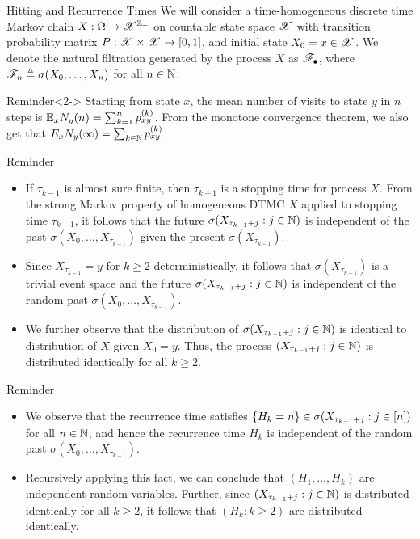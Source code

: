 \documentclass[12pt,aspectratio=169]{beamer}
\begin{document}
\begin{frame}{Hitting and Recurrence Times}
We will consider a time-homogeneous discrete time Markov chain $X: \Omega \to \mathscr{X}^{\mathbb{Z}_+}$ on countable state space $\mathscr{X}$ with transition probability matrix $P: \mathscr{X} \times \mathscr{X} \to [0,1]$, 
and initial state $X_0 = x \in \mathscr{X}$. 
We denote the natural filtration generated by the process $X$ as $\mathscr{F}_\bullet$, 
where $\mathscr{F}_n \triangleq \sigma(X_0, \dots, X_n)$ for all $n \in \mathbb{N}$. 
\begin{block}{Reminder}<2->
Starting from state $x$, the mean number of visits to state $y$ in $n$ steps is $\mathbb{E}_xN_y(n) = \sum_{k=1}^np_{xy}^{(k)}$. 
From the monotone convergence theorem, we also get that 
$E_xN_y(\infty) = \sum_{k \in \mathbb{N}}p_{xy}^{(k)}$. 
\end{block}
\end{frame}


\begin{frame}
\begin{block}{Reminder} 
\begin{itemize}
\item <1-> If $\tau_{k-1}$ is almost sure finite, then $\tau_{k-1}$ is a stopping time for process $X$. 
From the strong Markov property of homogeneous DTMC $X$ applied to stopping time $\tau_{k-1}$, 
it follows that the future $\sigma(X_{\tau_{k-1}+j}: j \in \mathbb{N})$ is independent of the past $\sigma(X_0, \dots, X_{\tau_{k-1}})$ given the present $\sigma(X_{\tau_{k-1}})$. 
\item <2-> Since $X_{\tau_{k-1}}= y$ for $k \ge 2$ deterministically, it follows that $\sigma(X_{\tau_{k-1}})$ is a trivial event space and the future $\sigma(X_{\tau_{k-1}+j}: j \in \mathbb{N})$ is independent of the random past $\sigma(X_0, \dots, X_{\tau_{k-1}})$. 
\item <3-> We further observe that the distribution of $\sigma(X_{\tau_{k-1}+j}: j \in \mathbb{N})$ is identical to distribution of $X$ given $X_0= y$. 
Thus, the process $(X_{\tau_{k-1}+j}: j \in \mathbb{N})$ is distributed identically for all $k \ge 2$. 
\end{itemize}
\end{block}
\end{frame}


\begin{frame}
\begin{block}{Reminder}
\begin{itemize}
\item <1-> We observe that the recurrence time satisfies $\left\{H_k = n\right\} \in \sigma(X_{\tau_{k-1}+j}: j \in [n])$ for all $n \in \mathbb{N}$, 
and hence the recurrence time $H_k$ is independent of the random past $\sigma(X_0, \dots, X_{\tau_{k-1}})$. 
\item <2-> Recursively applying this fact, we can conclude that $(H_1, \dots, H_k)$ are independent random variables. 
Further, since $(X_{\tau_{k-1}+j}: j \in \mathbb{N})$ is distributed identically for all $k \ge 2$, it follows that $(H_k: k \ge 2)$ are distributed identically.
\end{itemize}
\end{block}
\end{frame}
\end{document}
